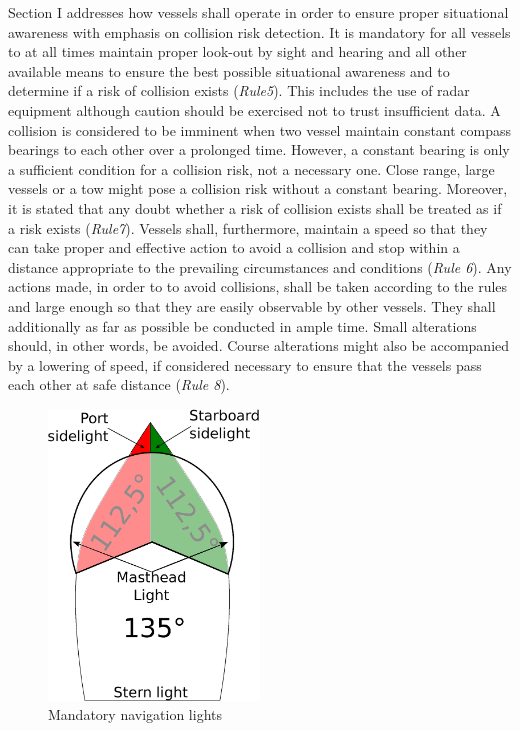 Section I addresses how vessels shall operate in order to ensure proper situational awareness with emphasis on collision risk detection.
It is mandatory for  all vessels to at all times maintain proper look-out by sight and hearing and all other available means to ensure the best possible situational awareness and  to determine if a risk of collision exists (\textit{Rule5}).
This includes the use of radar equipment although caution should be exercised not to trust insufficient data. A collision is considered to be imminent when two vessel maintain constant compass bearings to each other over a prolonged time.
However, a constant bearing is only a sufficient condition for a collision risk, not a necessary one. Close range, large vessels or a tow might pose a collision risk without a constant bearing. Moreover, it is stated that any doubt whether a risk of collision exists shall be treated as if a risk exists (\textit{Rule7}).
Vessels shall, furthermore, maintain a speed so that they can take proper and effective action to avoid a collision and stop within a distance appropriate to the prevailing circumstances and conditions (\textit{Rule 6}). Any actions made, in order to to avoid collisions, shall be taken according to the rules and large enough so that they are easily observable by other vessels. They shall additionally as far as possible be conducted in ample time. Small alterations should, in other words, be avoided. Course alterations might also be accompanied by a lowering of speed, if considered necessary to ensure that the vessels pass each other at safe distance (\textit{Rule 8}).
\begin{figure}
    \centering
    \includegraphics[width=0.5\textwidth,height=0.5\textheight,keepaspectratio]{Figures/lights.eps}
    \caption{Mandatory navigation lights}
    \label{fig:nav_lights}
\end{figure}
